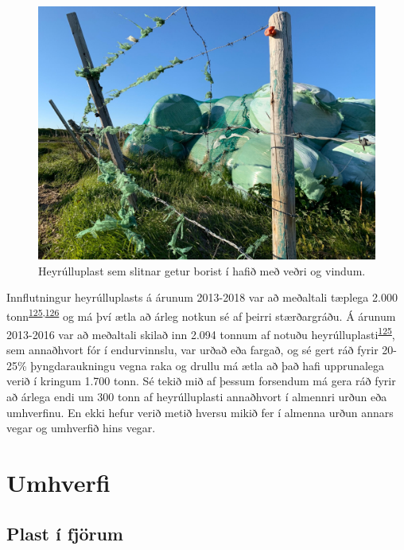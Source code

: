 \documentclass[icelandic,]{book}
\begin{document}
\begin{figure}[H]

{\centering \includegraphics[width=1\linewidth]{myndir/heyrullur.jpg} 

}

\caption{Heyrúlluplast sem slitnar getur borist í hafið með veðri og vindum.}\label{fig:heyrullur}
\end{figure}

Innflutningur heyrúlluplasts á árunum 2013-2018 var að meðaltali tæplega 2.000 tonn\textsuperscript{\protect\hyperlink{ref-Urvinnslusjouxf0ur2016}{125},\protect\hyperlink{ref-tollurinn}{126}} og má því ætla að árleg notkun sé af þeirri stærðargráðu. Á árunum 2013-2016 var að meðaltali skilað inn 2.094 tonnum af notuðu heyrúlluplasti\textsuperscript{\protect\hyperlink{ref-Urvinnslusjouxf0ur2016}{125}}, sem annaðhvort fór í endurvinnslu, var urðað eða fargað, og sé gert ráð fyrir 20-25\% þyngdaraukningu vegna raka og drullu má ætla að það hafi upprunalega verið í kringum 1.700 tonn. Sé tekið mið af þessum forsendum má gera ráð fyrir að árlega endi um 300 tonn af heyrúlluplasti annaðhvort í almennri urðun eða umhverfinu. En ekki hefur verið metið hversu mikið fer í almenna urðun annars vegar og umhverfið hins vegar.

\hypertarget{umhverfi}{%
\section*{Umhverfi}\label{umhverfi}}

\hypertarget{plast-i-fjorum}{%
\subsection*{Plast í fjörum}\label{plast-i-fjorum}}
\end{document}
